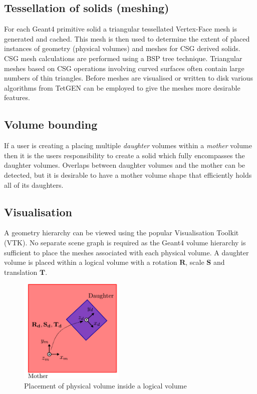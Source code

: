 \documentclass[final,5p,times,twocolumn]{elsarticle}
\begin{document}
\subsection{Tessellation of solids (meshing)}
For each Geant4 primitive solid a triangular tessellated Vertex-Face mesh is generated and cached. This mesh is then used to determine the extent of placed instances of 
geometry (physical volumes) and meshes for CSG derived solids. CSG mesh calculations are performed using a BSP tree technique. Triangular meshes based
on CSG operations involving curved surfaces often contain large numbers of thin triangles. Before meshes are visualised or written to disk various algorithms from 
TetGEN can be employed to give the meshes more desirable features. 

\subsection{Volume bounding} 
If a user is creating a placing multiple {\em daughter} volumes within a {\em mother} volume then it is the users responsibility to create a solid which fully encompasses the 
daughter volumes. Overlaps between daughter volumes and the mother can be detected, but it is desirable to have a mother volume shape that efficiently holds all of its daughters. 
 
\subsection{Visualisation} \label{sec:visualisation}
A  geometry hierarchy can be viewed using the popular Visualisation Toolkit (VTK). No separate scene graph is required as the Geant4 volume hierarchy is sufficient 
to place the meshes associated with each physical volume. A daughter volume is placed within a logical volume with a rotation $\mathbf{R}$, scale $\mathbf{S}$ and 
translation $\mathbf{T}$.

\begin{figure}[htbp]
\begin{center}
\includegraphics[width=5cm]{./diagrams/lvToPv.pdf}
\caption{Placement of physical volume inside a logical volume}
\label{fig:lvToPv}
\end{center}
\end{figure} 
\end{document}
